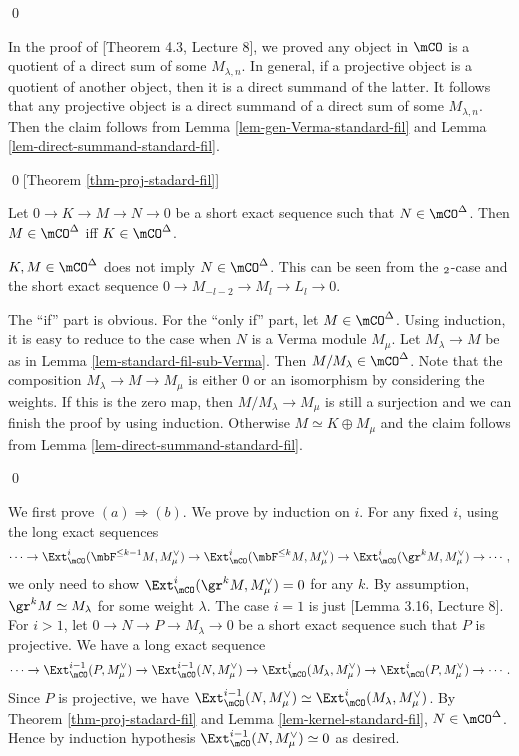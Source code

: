 	\qed



		In the proof of [Theorem 4.3, Lecture 8], we proved any object in $\mCO$ is a quotient of a direct sum of some $M_{\lambda,n}$. In general, if a projective object is a quotient of another object, then it is a direct summand of the latter. It follows that any projective object is a direct summand of a direct sum of some $M_{\lambda,n}$. Then the claim follows from Lemma \ref{lem-gen-Verma-standard-fil} and Lemma \ref{lem-direct-summand-standard-fil}.

	\qed[Theorem \ref{thm-proj-stadard-fil}]

	\begin{lem}
		\label{lem-kernel-standard-fil}
		Let $0 \to K \to M \to N \to 0$ be a short exact sequence such that $N\in \mCO^\Delta$. Then $M\in \mCO^\Delta$ iff $K\in \mCO^\Delta$.
	\end{lem}

	\begin{warn}
		$K,M\in \mCO^\Delta$ does not imply $N\in \mCO^\Delta$. This can be seen from the $\sl_2$-case and the short exact sequence $0\to M_{-l-2} \to M_l \to L_l \to 0$.
	\end{warn}

	\proof
		The ``if'' part is obvious. For the ``only if'' part, let $M\in \mCO^\Delta$. Using induction, it is easy to reduce to the case when $N$ is a Verma module $M_\mu$. Let $M_\lambda \to M$ be as in Lemma \ref{lem-standard-fil-sub-Verma}. Then $M/M_\lambda\in \mCO^\Delta$. Note that the composition $M_\lambda \to M \to M_\mu$ is either $0$ or an isomorphism by considering the weights. If this is the zero map, then $M/M_\lambda \to M_\mu$ is still a surjection and we can finish the proof by using induction. Otherwise $M\simeq K\oplus M_\mu$ and the claim follows from Lemma \ref{lem-direct-summand-standard-fil}.

	\qed

		We first prove $(a)\Rightarrow (b)$. We prove by induction on $i$. For any fixed $i$, using the long exact sequences
		\[
			\cdots \to \Ext_\mCO^i(\mbF^{\le k-1} M,M_\mu^\vee) \to \Ext_\mCO^i(\mbF^{\le k} M,M_\mu^\vee) \to \Ext_\mCO^i(\gr^k M,M_\mu^\vee)  \to \cdots,
		\]
		we only need to show $ \Ext_\mCO^i(\gr^k M,M_\mu^\vee)  = 0$ for any $k$. By assumption, $\gr^k M\simeq M_\lambda$ for some weight $\lambda$. The case $i=1$ is just [Lemma 3.16, Lecture 8]. For $i>1$, let $0 \to N \to P\to  M_\lambda\to 0$ be a short exact sequence such that $P$ is projective. We have a long exact sequence
		\[
			\cdots \to \Ext_\mCO^{i-1}(P,M_\mu^\vee) \to \Ext_\mCO^{i-1}(N,M_\mu^\vee) \to \Ext_\mCO^i(M_\lambda,M_\mu^\vee) \to \Ext_\mCO^{i}(P,M_\mu^\vee) \to \cdots.
		\]
		Since $P$ is projective, we have $\Ext_\mCO^{i-1}(N,M_\mu^\vee) \simeq \Ext_\mCO^i(M_\lambda,M_\mu^\vee)$. By Theorem \ref{thm-proj-stadard-fil} and Lemma \ref{lem-kernel-standard-fil}, $N\in \mCO^\Delta$. Hence by induction hypothesis $\Ext_\mCO^{i-1}(N,M_\mu^\vee) \simeq 0$ as desired.

